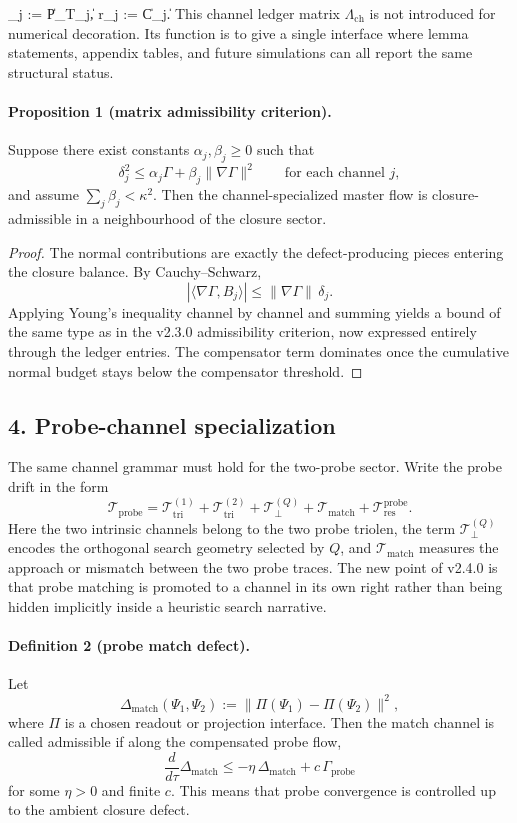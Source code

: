 \delta_j := \|P_{}T_j\|,
\qquad
r_j := \|C_j\|.
\]
This channel ledger matrix $\Lambda_{\mathrm{ch}}$ is not introduced for numerical decoration. Its function is to give a
single interface where lemma statements, appendix tables, and future simulations
can all report the same structural status.

\paragraph{Proposition 1 (matrix admissibility criterion).}
Suppose there exist constants $\alpha_j,\beta_j\ge0$ such that
\[
\delta_j^2 \le \alpha_j \Gamma + \beta_j \|\nabla\Gamma\|^2
\qquad\text{for each channel }j,
\]
and assume $\sum_j \beta_j < \kappa^2$. Then the channel-specialized master flow is
closure-admissible in a neighbourhood of the closure sector.

\begin{proof}
The normal contributions are exactly the defect-producing pieces entering the
closure balance. By Cauchy--Schwarz,
\[
|\langle \nabla\Gamma, B_j\rangle|
\le \|\nabla\Gamma\|\,\delta_j.
\]
Applying Young's inequality channel by channel and summing yields a bound of the
same type as in the v2.3.0 admissibility criterion, now expressed entirely through
the ledger entries. The compensator term dominates once the cumulative normal
budget stays below the compensator threshold.
\end{proof}

\subsection*{4. Probe-channel specialization}
The same channel grammar must hold for the two-probe sector. Write the probe drift
in the form
\[
\mathcal T_{\mathrm{probe}} =
\mathcal T_{\mathrm{tri}}^{(1)} +
\mathcal T_{\mathrm{tri}}^{(2)} +
\mathcal T_{\perp}^{(Q)} +
\mathcal T_{\mathrm{match}} +
\mathcal T_{\mathrm{res}}^{\mathrm{probe}}.
\]
Here the two intrinsic channels belong to the two probe triolen, the term
$\mathcal T_{\perp}^{(Q)}$ encodes the orthogonal search geometry selected by $Q$,
and $\mathcal T_{\mathrm{match}}$ measures the approach or mismatch between the two
probe traces. The new point of v2.4.0 is that probe matching is promoted to
a channel in its own right rather than being hidden implicitly inside a heuristic
search narrative.

\paragraph{Definition 2 (probe match defect).}
Let
\[
\Delta_{\mathrm{match}}(\Psi_1,\Psi_2)
:= \|\Pi(\Psi_1)-\Pi(\Psi_2)\|^2,
\]
where $\Pi$ is a chosen readout or projection interface. Then the match channel is
called admissible if along the compensated probe flow,
\[
\frac{d}{d\tau}\Delta_{\mathrm{match}}
\le -\eta\,\Delta_{\mathrm{match}} + c\,\Gamma_{\mathrm{probe}}
\]
for some $\eta>0$ and finite $c$.
This means that probe convergence is controlled up to the ambient closure defect.

